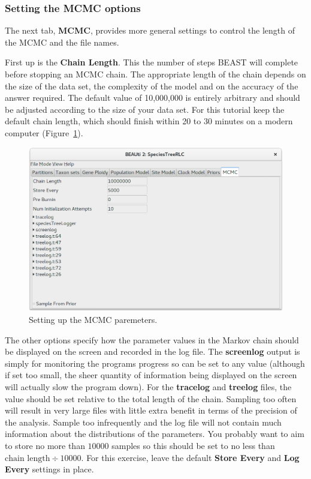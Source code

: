 \documentclass{article}
\begin{document}
\subsubsection*{Setting the MCMC options }

The next tab, \textbf{MCMC}, provides more general settings to control the
length of the MCMC and the file names.

First up is the \textbf{Chain Length}. This the number of steps BEAST will
complete before stopping an MCMC chain. The appropriate length of the chain
depends on the size of the data set, the complexity of the model and on the
accuracy of the answer required. The default value of 10,000,000 is entirely
arbitrary and should be adjusted according to the size of your data set. For
this tutorial keep the default chain length, which should finish within 20
to 30 minutes on a modern computer (Figure~\ref{fig:mcmc}).

\begin{figure}[htb!]
\centering
\includegraphics[width=\textwidth]{figures/beauti-mcmc.png}
\caption{Setting up the MCMC paremeters.}
\label{fig:mcmc}
\end{figure}

The other options specify how the parameter values in the Markov chain should be
displayed on the screen and recorded in the log file. The \textbf{screenlog} output is
simply for monitoring the programs progress so can be set to any value (although
if set too small, the sheer quantity of information being displayed on the
screen will actually slow the program down). For the \textbf{tracelog} and \textbf{treelog} files, the value should
be set relative to the total length of the chain. Sampling too often will result
in very large files with little extra benefit in terms of the precision of the
analysis. Sample too infrequently and the log file will not contain much
information about the distributions of the parameters. You probably want to aim
to store no more than $10000$ samples so this should be set to no less than
$\text{chain length}\div10000$. For this exercise, leave the default \textbf{Store
Every} and \textbf{Log Every} settings in place.
\end{document}
